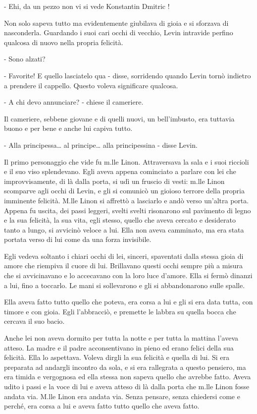 - Ehi, da un pezzo non vi si vede Konstantin Dmitric ! 

Non solo sapeva tutto ma evidentemente giubilava di gioia e si sforzava di nasconderla. Guardando i suoi cari occhi di vecchio, Levin intravide perfino qualcosa di nuovo nella propria felicità. 

- Sono alzati? 

- Favorite! E quello lasciatelo qua - disse, sorridendo quando Levin tornò indietro a prendere il cappello. Questo voleva significare qualcosa. 

- A chi devo annunciare? - chiese il cameriere. 

Il cameriere, sebbene giovane e di quelli nuovi, un bell'imbusto, era tuttavia buono e per bene e anche lui capiva tutto. 

- Alla principessa\ldots{} al principe\ldots{} alla principessina - disse Levin. 

Il primo personaggio che vide fu m.lle Linon. Attraversava la sala e i suoi riccioli e il suo viso splendevano. Egli aveva appena cominciato a parlare con lei che improvvisamente, di là dalla porta, si udì un fruscio di vesti: m.lle Linon scomparve agli occhi di Levin, e gli si comunicò un gioioso terrore della propria imminente felicità. M.lle Linon si affrettò a lasciarlo e andò verso un'altra porta. Appena fu uscita, dei passi leggeri, svelti svelti risonarono sul pavimento di legno e la sua felicità, la sua vita, egli stesso, quello che aveva cercato e desiderato tanto a lungo, si avvicinò veloce a lui. Ella non aveva camminato, ma era stata portata verso di lui come da una forza invisibile. 

Egli vedeva soltanto i chiari occhi di lei, sinceri, spaventati dalla stessa gioia di amore che riempiva il cuore di lui. Brillavano questi occhi sempre più a misura che si avvicinavano e lo accecavano con la loro luce d'amore. Ella si fermò dinanzi a lui, fino a toccarlo. Le mani si sollevarono e gli si abbandonarono sulle spalle. 

Ella aveva fatto tutto quello che poteva, era corsa a lui e gli si era data tutta, con timore e con gioia. Egli l'abbracciò, e premette le labbra su quella bocca che cercava il suo bacio. 

Anche lei non aveva dormito per tutta la notte e per tutta la mattina l'aveva atteso. La madre e il padre acconsentivano in pieno ed erano felici della sua felicità. Ella lo aspettava. Voleva dirgli la sua felicità e quella di lui. Si era preparata ad andargli incontro da sola, e si era rallegrata a questo pensiero, ma era timida e vergognosa ed ella stessa non sapeva quello che avrebbe fatto. Aveva udito i passi e la voce di lui e aveva atteso di là dalla porta che m.lle Linon fosse andata via. M.lle Linon era andata via. Senza pensare, senza chiedersi come e perché, era corsa a lui e aveva fatto tutto quello che aveva fatto. 

